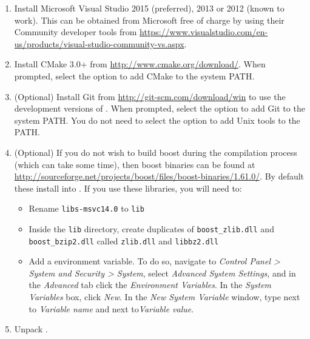 \begin{enumerate}
  \item Install Microsoft Visual Studio 2015 (preferred), 2013 or 2012 (known to
  work). This can be obtained from Microsoft free of charge by using their
  Community developer tools from
  \url{https://www.visualstudio.com/en-us/products/visual-studio-community-vs.aspx}.
  \item Install CMake 3.0+ from \url{http://www.cmake.org/download/}. When
  prompted, select the option to add CMake to the system PATH.
  \item (Optional) Install Git from \url{http://git-scm.com/download/win} to use
  the development versions of \nekpp. When prompted, select the option to add
  Git to the system PATH. You do not need to select the option to add Unix tools
  to the PATH.
  \item (Optional) If you do not wish to build boost during the compilation
  process (which can take some time), then boost binaries can be found at
  \url{http://sourceforge.net/projects/boost/files/boost-binaries/1.61.0/}. By
  default these install into . If you use these libraries, you will need to:
  \begin{itemize}
    \item Rename \texttt{libs-msvc14.0} to \texttt{lib}
    \item Inside the \texttt{lib} directory, create duplicates of
    \texttt{boost\_zlib.dll} and \texttt{boost\_bzip2.dll} called
    \texttt{zlib.dll} and \texttt{libbz2.dll}
	\item Add a  environment variable. To do so,
	navigate to \emph{Control Panel > System and Security > System}, select
	\emph{Advanced System Settings}, and in the \emph{Advanced} tab click the
	\emph{Environment Variables}. In the \emph{System Variables} box, click
	\emph{New}. In the \emph{New System Variable} window, type 
	next to \emph{Variable name} and  next to\emph{Variable value}.
  \end{itemize}
  \item Unpack .


\end{enumerate}
